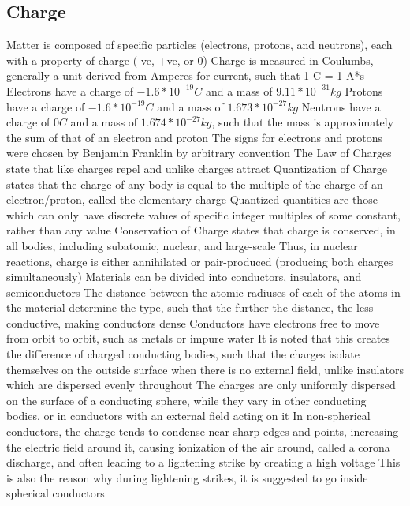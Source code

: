 \documentclass[11 pt, twoside]{article}
\newenvironment{outline*}
{
	\begin{outline}[enumerate]
	}
	{\end{outline}
}
\begin{document}
\subsection{Charge}
\begin{outline*}
\1 Matter is composed of specific particles (electrons, protons, and neutrons), each with a property of charge (-ve, +ve, or 0)
\2 Charge is measured in Coulumbs, generally a unit derived from Amperes for current, such that 1 C = 1 A*s
\2 Electrons have a charge of $-1.6*10^{-19} C$ and a mass of $9.11*10^{-31} kg$
\2 Protons have a charge of $-1.6*10^{-19} C$ and a mass of $1.673*10^{-27} kg$
\2 Neutrons have a charge of $0 C$ and a mass of $1.674*10^{-27} kg$, such that the mass is approximately the sum of that of an electron and proton
\2 The signs for electrons and protons were chosen by Benjamin Franklin by arbitrary convention
\1 The Law of Charges state that like charges repel and unlike charges attract
\1 Quantization of Charge states that the charge of any body is equal to the multiple of the charge of an electron/proton, called the elementary charge
\2 Quantized quantities are those which can only have discrete values of specific integer multiples of some constant, rather than any value
\1 Conservation of Charge states that charge is conserved, in all bodies, including subatomic, nuclear, and large-scale
\2 Thus, in nuclear reactions, charge is either annihilated or pair-produced (producing both charges simultaneously)
\1 Materials can be divided into conductors, insulators, and semiconductors
\2 The distance between the atomic radiuses of each of the atoms in the material determine the type, such that the further the distance, the less conductive, making conductors dense
\2 Conductors have electrons free to move from orbit to orbit, such as metals or impure water
\3 It is noted that this creates the difference of charged conducting bodies, such that the charges isolate themselves on the outside surface when there is no external field, unlike insulators which are dispersed evenly throughout
\4 The charges are only uniformly dispersed on the surface of a conducting sphere, while they vary in other conducting bodies, or in conductors with an external field acting on it
\4 In non-spherical conductors, the charge tends to condense near sharp edges and points, increasing the electric field around it, causing ionization of the air around, called a corona discharge, and often leading to a lightening strike by creating a high voltage
\4 This is also the reason why during lightening strikes, it is suggested to go inside spherical conductors

\end{outline*}
\end{document}
